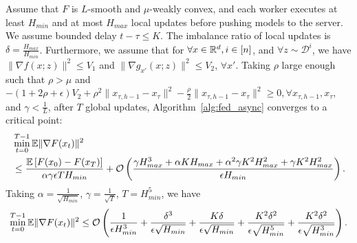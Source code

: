 \documentclass{opt2020} %
\begin{document}
\begin{theorem}
Assume that $F$ is $L$-smooth and $\mu$-weakly convex, and each worker executes at least $H_{min}$ and at most $H_{max}$ local updates before pushing models to the server. We assume bounded delay $t-\tau \leq K$. The imbalance ratio of local updates is $\delta = \frac{H_{max}}{H_{min}}$. Furthermore, we assume that for $\forall x \in {\mathbb{R}}^d, i \in [n]$, and $\forall z \sim \mathcal{D}^i$, we have $\| \nabla f(x; z) \|^2 \leq V_1$ and $\| \nabla g_{x'}(x; z) \|^2 \leq V_2$, $\forall x'$. Taking $\rho$ large enough such that $\rho > \mu$ and $- (1 + 2 \rho + \epsilon) V_2 + \rho^2 \|x_{\tau, h-1} - x_\tau\|^2 - \frac{\rho}{2} \|x_{\tau, h-1} - x_\tau\|^2 \geq 0, \forall x_{\tau, h-1}, x_{\tau}$, and $\gamma < \frac{1}{L}$, after $T$ global updates, Algorithm~\ref{alg:fed_async} converges to a critical point:
\begin{align*}
&\min_{t = 0}^{T-1} {\mathbb{E}} \| \nabla F(x_t) \|^2  \\
&\leq \frac{{\mathbb{E}}\left[ F(x_{0}) - F(x_T) \right]}{\alpha \gamma \epsilon T H_{min}}  + {\mathcal O}\left( \frac{\gamma H_{max}^3 + \alpha K H_{max} + \alpha^2\gamma K^2 H_{max}^2 + \gamma K^2 H_{max}^2 }{\epsilon H_{min}} \right).
\end{align*}
Taking $\alpha = \frac{1}{\sqrt{H_{min}}}$, $\gamma = \frac{1}{\sqrt{T}}$, $T = H_{min}^5$, we have
\begin{align*}
\min_{t = 0}^{T-1} {\mathbb{E}} \| \nabla F(x_t) \|^2
\leq {\mathcal O}\left( \frac{1}{\epsilon H_{min}^3}
 + \frac{\delta^3}{\epsilon \sqrt{H_{min}}}
 + \frac{K \delta}{\epsilon \sqrt{H_{min}}}
 + \frac{K^2 \delta^2}{\epsilon \sqrt{H_{min}^5}}
 + \frac{K^2 \delta^2}{\epsilon \sqrt{H_{min}^3}} \right).
\end{align*}
\end{theorem}
\end{document}
